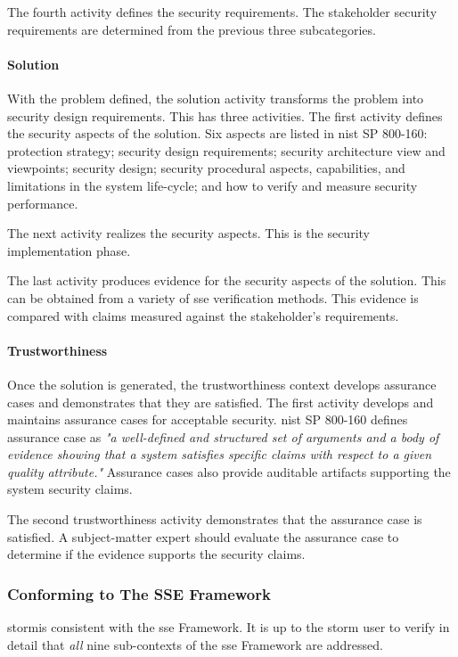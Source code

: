 \documentclass[../../main/main.tex]{subfiles}
\begin{document}
The fourth activity defines the security requirements.  The stakeholder security requirements are determined from the previous three subcategories.

\paragraph*{Solution}
With the problem defined, the solution activity transforms the problem into security design requirements.  This has three activities.  The first activity defines the security aspects of the solution. Six aspects are listed in \gls{nist} SP 800-160: protection strategy; security design requirements; security architecture view and viewpoints; security design; security procedural aspects, capabilities, and limitations in the system life-cycle; and how to verify and measure security performance. 

The next activity realizes the security aspects.  This is the security implementation phase.

The last activity produces evidence for the security aspects of the solution. This can be obtained from a variety of \gls{sse} verification methods.  This evidence is compared with claims measured against the stakeholder's requirements.

\paragraph*{Trustworthiness}
Once the solution is generated, the trustworthiness context develops assurance cases and demonstrates that they are satisfied.  The first activity develops and maintains assurance cases for acceptable security.  \gls{nist} SP 800-160 defines assurance case as \textit{"a well-defined and structured set of arguments and a body of evidence showing that a system satisfies specific claims with respect to a given quality attribute."}  Assurance cases also provide auditable artifacts supporting the system security claims.

The second trustworthiness activity demonstrates that the assurance case is satisfied.  A subject-matter expert should evaluate the assurance case to determine if the evidence supports the security claims.

\subsubsection{Conforming to The SSE Framework}
\gls{storm}is consistent with the \gls{sse} Framework.  It is up to the \gls{storm} user to verify in detail that \textit{all} nine sub-contexts of the \gls{sse} Framework are addressed.  
\end{document}

